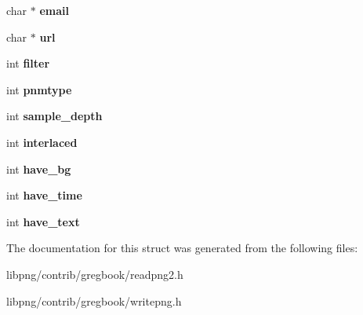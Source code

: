 \begin{DoxyCompactItemize}
\item 
\hypertarget{struct__mainprog__info_aed6d174ec9f9de2f35b7c8e96a1255dc}{char $\ast$ {\bfseries email}}\label{struct__mainprog__info_aed6d174ec9f9de2f35b7c8e96a1255dc}

\item 
\hypertarget{struct__mainprog__info_ab9a52438e6e7d09d7f103dfc489875fa}{char $\ast$ {\bfseries url}}\label{struct__mainprog__info_ab9a52438e6e7d09d7f103dfc489875fa}

\item 
\hypertarget{struct__mainprog__info_ac5e969e989116456e57c94d3af8c6a01}{int {\bfseries filter}}\label{struct__mainprog__info_ac5e969e989116456e57c94d3af8c6a01}

\item 
\hypertarget{struct__mainprog__info_aa25bf8ed28dde10b890bb44056159c41}{int {\bfseries pnmtype}}\label{struct__mainprog__info_aa25bf8ed28dde10b890bb44056159c41}

\item 
\hypertarget{struct__mainprog__info_a4484511d4b0778ebe724bbf2c6b943e3}{int {\bfseries sample\-\_\-depth}}\label{struct__mainprog__info_a4484511d4b0778ebe724bbf2c6b943e3}

\item 
\hypertarget{struct__mainprog__info_ada4148816c47251cee1fe26ce7683e36}{int {\bfseries interlaced}}\label{struct__mainprog__info_ada4148816c47251cee1fe26ce7683e36}

\item 
\hypertarget{struct__mainprog__info_a13a75828381686175b62795bb263f439}{int {\bfseries have\-\_\-bg}}\label{struct__mainprog__info_a13a75828381686175b62795bb263f439}

\item 
\hypertarget{struct__mainprog__info_ac742840576dedf6cb159a5eace93a6fe}{int {\bfseries have\-\_\-time}}\label{struct__mainprog__info_ac742840576dedf6cb159a5eace93a6fe}

\item 
\hypertarget{struct__mainprog__info_a5977cba5319c5e907cff2ce842720ccc}{int {\bfseries have\-\_\-text}}\label{struct__mainprog__info_a5977cba5319c5e907cff2ce842720ccc}

\end{DoxyCompactItemize}


The documentation for this struct was generated from the following files\-:\begin{DoxyCompactItemize}
\item 
libpng/contrib/gregbook/readpng2.\-h\item 
libpng/contrib/gregbook/writepng.\-h\end{DoxyCompactItemize}
